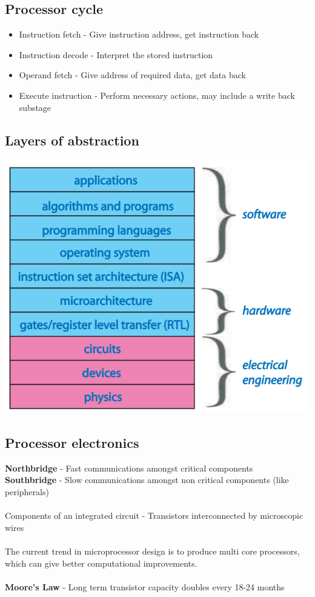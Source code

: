 \documentclass{article}[18pt]
\begin{document}
\subsection{Processor cycle}
\begin{itemize}
	\item Instruction fetch - Give instruction address, get instruction back
	\item Instruction decode - Interpret the stored instruction
	\item Operand fetch - Give address of required data, get data back
	\item Execute instruction - Perform necessary actions, may include a write back substage
\end{itemize}
\subsection{Layers of abstraction}
\begin{center}
	\includegraphics[scale=0.5]{CSys}
\end{center}
\subsection{Processor electronics}
\textbf{Northbridge} - Fast communications amongst critical components\\
\textbf{Southbridge} - Slow communications amongst non critical components (like peripherals)\\
\\
Components of an integrated circuit - Transistors interconnected by microscopic wires\\
\\
The current trend in microprocessor design is to produce multi core processors, which can give better computational improvements.\\
\\
\textbf{Moore's Law} - Long term transistor capacity doubles every 18-24 months
\end{document}
